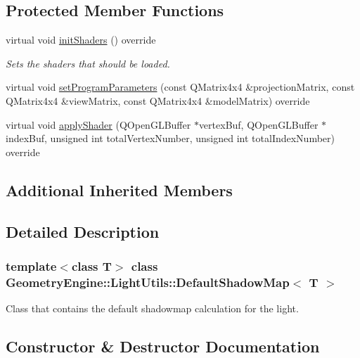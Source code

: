 \subsection*{Protected Member Functions}
\begin{DoxyCompactItemize}
\item 
\mbox{\label{class_geometry_engine_1_1_light_utils_1_1_default_shadow_map_a8c1da6b7ca3435144ae1daea1b0bc265}} 
virtual void \mbox{\hyperlink{class_geometry_engine_1_1_light_utils_1_1_default_shadow_map_a8c1da6b7ca3435144ae1daea1b0bc265}{init\+Shaders}} () override
\begin{DoxyCompactList}\small\item\em Sets the shaders that should be loaded. \end{DoxyCompactList}\item 
virtual void \mbox{\hyperlink{class_geometry_engine_1_1_light_utils_1_1_default_shadow_map_aabc10bddf31acc2e2e55588adca8bc90}{set\+Program\+Parameters}} (const Q\+Matrix4x4 \&projection\+Matrix, const Q\+Matrix4x4 \&view\+Matrix, const Q\+Matrix4x4 \&model\+Matrix) override
\item 
virtual void \mbox{\hyperlink{class_geometry_engine_1_1_light_utils_1_1_default_shadow_map_aa65ccc2e7a4f1dd7d5fd4ac6253f42dc}{apply\+Shader}} (Q\+Open\+G\+L\+Buffer $\ast$vertex\+Buf, Q\+Open\+G\+L\+Buffer $\ast$index\+Buf, unsigned int total\+Vertex\+Number, unsigned int total\+Index\+Number) override
\end{DoxyCompactItemize}
\subsection*{Additional Inherited Members}


\subsection{Detailed Description}
\subsubsection*{template$<$class T$>$\newline
class Geometry\+Engine\+::\+Light\+Utils\+::\+Default\+Shadow\+Map$<$ T $>$}

Class that contains the default shadowmap calculation for the light. 

\subsection{Constructor \& Destructor Documentation}
\mbox{\label{class_geometry_engine_1_1_light_utils_1_1_default_shadow_map_a8ef474f38d8d69a732971413dcfa453e}} 
